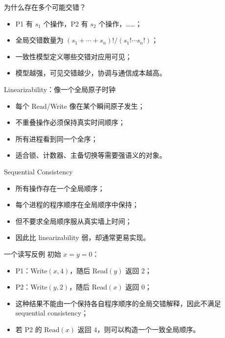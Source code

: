 \documentclass[UTF8,fontset=none,aspectratio=169,10pt]{beamer}
\begin{document}
\begin{frame}{为什么存在多个可能交错？}
\begin{itemize}
  \item P1 有 $s_1$ 个操作，P2 有 $s_2$ 个操作，……；
  \item 全局交错数量为 $(s_1+\cdots+s_n)!/(s_1!\cdots s_n!)$；
  \item 一致性模型定义哪些交错对应用可见；
  \item 模型越强，可见交错越少，协调与通信成本越高。
\end{itemize}
\end{frame}

\begin{frame}{Linearizability：像一个全局原子时钟}
\begin{itemize}
  \item 每个 Read/Write 像在某个瞬间原子发生；
  \item 不重叠操作必须保持真实时间顺序；
  \item 所有进程看到同一个全序；
  \item 适合锁、计数器、主备切换等需要强语义的对象。
\end{itemize}
\vfill
{}
\end{frame}

\begin{frame}{Sequential Consistency}
\begin{itemize}
  \item 所有操作存在一个全局顺序；
  \item 每个进程的程序顺序在全局顺序中保持；
  \item 但不要求全局顺序服从真实墙上时间；
  \item 因此比 linearizability 弱，却通常更易实现。
\end{itemize}
\end{frame}

\begin{frame}{一个读写反例}
初始 $x=y=0$：
\begin{itemize}
  \item P1：Write$(x,4)$，随后 Read$(y)$ 返回 2；
  \item P2：Write$(y,2)$，随后 Read$(x)$ 返回 0；
  \item 这种结果不能由一个保持各自程序顺序的全局交错解释，因此不满足 sequential consistency；
  \item 若 P2 的 Read$(x)$ 返回 4，则可以构造一个一致全局顺序。
\end{itemize}
\end{frame}
\end{document}
